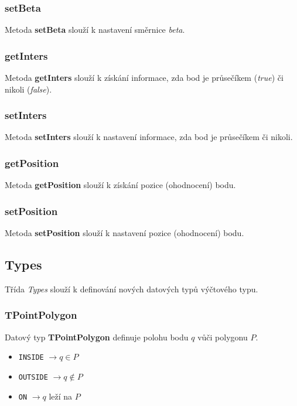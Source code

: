 \documentclass[a4paper, 12pt]{article}
\begin{document}
\subsubsection*{setBeta}
Metoda \textbf{setBeta} slouží k nastavení směrnice \textsl{beta}. 

\subsubsection*{getInters}
Metoda \textbf{getInters} slouží k získání informace, zda bod je průsečíkem (\textit{true}) či nikoli (\textit{false}).

\subsubsection*{setInters}
Metoda \textbf{setInters} slouží k nastavení informace, zda bod je průsečíkem či nikoli. 

\subsubsection*{getPosition}
Metoda \textbf{getPosition} slouží k získání pozice (ohodnocení) bodu.

\subsubsection*{setPosition}
Metoda \textbf{setPosition} slouží k nastavení pozice (ohodnocení) bodu. 


\subsection{Types}
Třída \textit{Types} slouží k definování nových datových typů výčtového typu.

\subsubsection*{TPointPolygon}
Datový typ \textbf{TPointPolygon} definuje polohu bodu $q$ vůči polygonu $P$.\\ 
\begin{itemize}
\item \texttt{INSIDE} $\rightarrow q \in P$
\item \texttt{OUTSIDE} $\rightarrow q \notin P$
\item \texttt{ON} $\rightarrow q$ leží na $P$
\end{itemize}
\end{document}
